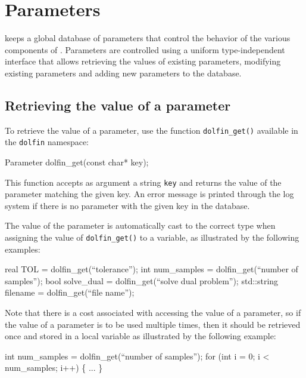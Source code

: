 \chapter{Parameters}
\label{sec:parameters}

\dolfin{} keeps a global database of parameters that control the
behavior of the various components of \dolfin{}. Parameters are
controlled using a uniform type-independent interface that allows
retrieving the values of existing parameters, modifying existing
parameters and adding new parameters to the database.

\section{Retrieving the value of a parameter}

To retrieve the value of a parameter, use the function \texttt{dolfin\_get()}
available in the \texttt{dolfin} namespace:
\begin{code}
  Parameter dolfin_get(const char* key);
\end{code}
This function accepts as argument a string \texttt{key} and returns
the value of the parameter matching the given key. An error message is
printed through the log system if there is no parameter with the given
key in the database.

The value of the parameter is automatically cast to the correct type
when assigning the value of \texttt{dolfin\_get()} to a variable, as
illustrated by the following examples:
\begin{code}
  real TOL = dolfin_get(``tolerance'');
  int num_samples = dolfin_get(``number of samples'');
  bool solve_dual = dolfin_get(``solve dual problem'');
  std::string filename = dolfin_get(``file name'');
\end{code}

Note that there is a cost associated with accessing the value of a
parameter, so if the value of a parameter is to be used multiple
times, then it should be retrieved once and stored in a local variable
as illustrated by the following example:
\begin{code}
  int num_samples = dolfin_get(``number of samples'');
  for (int i = 0; i < num_samples; i++)
  \{
    ...
  \}
\end{code}

